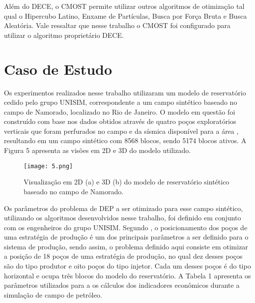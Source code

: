 Além do DECE, o CMOST permite utilizar outros algoritmos de otimização tal qual o Hipercubo Latino, Enxame de Partículas, Busca por Força Bruta e Busca Aleatória. Vale ressaltar que nesse trabalho o CMOST foi configurado para utilizar o algoritmo proprietário DECE.

\section{Caso de Estudo}

Os experimentos realizados nesse trabalho utilizaram um modelo de reservatório cedido pelo grupo UNISIM, correspondente a um campo sintético baseado no campo de Namorado, localizado no Rio de Janeiro. O modelo em questão foi construído com base nos dados obtidos através de quatro poços exploratórios verticais que foram perfurados no campo e da sísmica disponível para a área \cite{Silva2016}, resultando em um campo sintético com 8568 blocos, sendo 5174 blocos ativos. A Figura 5 apresenta as visões em 2D e 3D do modelo utilizado.

\begin{figure}[htb]

\texttt{[image: 5.png]}

\caption{Visualização em 2D (a) e 3D (b) do modelo de reservatório sintético baseado no campo de Namorado.}


\end{figure}

Os parâmetros do problema de DEP a ser otimizado para esse campo sintético, utilizando os algoritmos desenvolvidos nesse trabalho, foi definido em conjunto com os engenheiros do grupo UNISIM. Segundo , o posicionamento dos poços de uma estratégia de produção é um dos principais parâmetros a ser definido para o sistema de produção, sendo assim, o problema definido aqui consiste em otimizar a posição de 18 poços de uma estratégia de produção, no qual dez desses poços são do tipo produtor e oito poços do tipo injetor. Cada um desses poços é do tipo horizontal e ocupa três blocos do modelo do reservatório. A Tabela 1 apresenta os parâmetros utilizados para a os cálculos dos indicadores econômicos durante a simulação de campo de petróleo.

